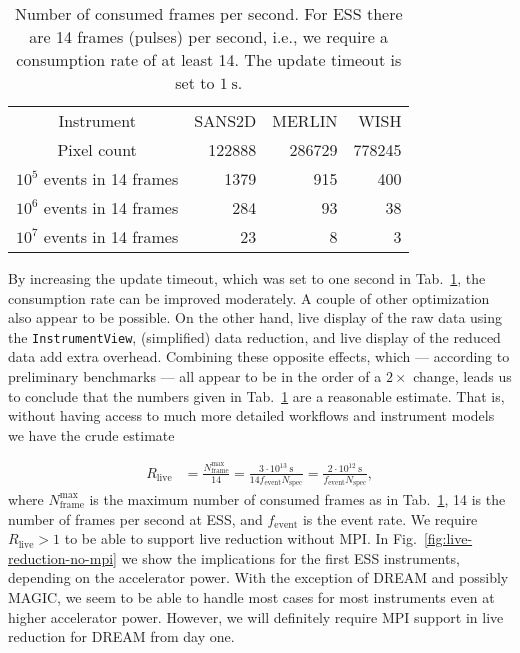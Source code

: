 \documentclass[a4paper,english,numbers=noenddot,bibliography=totoc,chapterprefix=on,DIV=12]{scrartcl}
\newcommand{\Nspec}{N_{\text{spec}}}
\newcommand{\Fevent}{f_{\text{event}}}
\newcommand{\dream}{DREAM\xspace}
\newcommand{\magic}{MAGIC\xspace}
\begin{document}
\begin{table}
  \centering
  \begin{tabular}{c|rrr}
    Instrument & SANS2D & MERLIN & WISH\\
    Pixel count & 122888 & 286729 & 778245\\
    \hline
    $10^5$ events in 14 frames & 1379 & 915 & 400 \\
    $10^6$ events in 14 frames & 284 & 93 & 38 \\
    $10^7$ events in 14 frames & 23 & 8 & 3 \\
  \end{tabular}
  \caption{\label{tab:consumption-rate}Number of consumed frames per second. For ESS there are 14 frames (pulses) per second, i.e., we require a consumption rate of at least 14. The update timeout is set to $1~\mathrm{s}$.}
\end{table}

By increasing the update timeout, which was set to one second in Tab.~\ref{tab:consumption-rate}, the consumption rate can be improved moderately.
A couple of other optimization also appear to be possible.
On the other hand, live display of the raw data using the \verb|InstrumentView|, (simplified) data reduction, and live display of the reduced data add extra overhead.
Combining these opposite effects, which --- according to preliminary benchmarks --- all appear to be in the order of a $2\times$ change, leads us to conclude that the numbers given in Tab.~\ref{tab:consumption-rate} are a reasonable estimate.
That is, without having access to much more detailed workflows and instrument models we have the crude estimate

\begin{align}
  R_{\text{live}} &= \frac{N_{\text{frame}}^{\text{max}}}{14} = \frac{3\cdot10^{13}~\mathrm{s}}{14\Fevent\Nspec} = \frac{2\cdot10^{12}~\mathrm{s}}{\Fevent\Nspec},
\end{align}
where $N_{\text{frame}}^{\text{max}}$ is the maximum number of consumed frames as in Tab.~\ref{tab:consumption-rate}, 14 is the number of frames per second at ESS, and $\Fevent$ is the event rate.
We require $R_{\text{live}} > 1$ to be able to support live reduction without MPI.
In Fig.~\ref{fig:live-reduction-no-mpi} we show the implications for the first ESS instruments, depending on the accelerator power.
With the exception of \dream and possibly \magic, we seem to be able to handle most cases for most instruments even at higher accelerator power.
However, we will definitely require MPI support in live reduction for \dream from day one.
\end{document}
